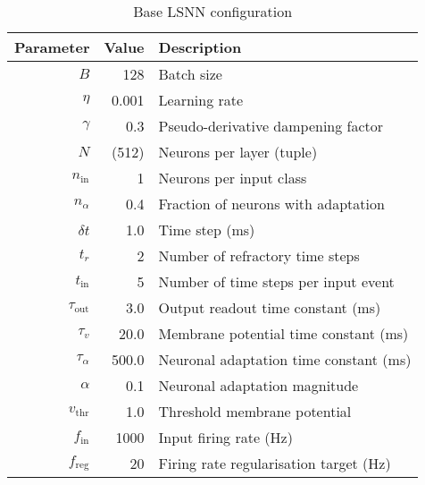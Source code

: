 \documentclass[../../report.tex]{subfiles}
\begin{document}
\begin{table}
  \begin{center}
    \renewcommand{\arraystretch}{1.25}
    \begin{tabular}{ r | r | l }
      Parameter & Value & Description
      \\ \hline
      \(B\) & 128 & Batch size
      \\
      \(\eta\) & 0.001 & Learning rate
      \\
      \(\gamma\) & 0.3 & Pseudo-derivative dampening factor
      \\
      \(N\) & (512) & Neurons per layer (tuple)
      \\
      \(n_\mathrm{in}\) & 1 & Neurons per input class
      \\
      \(n_\alpha\) & 0.4 & Fraction of neurons with adaptation
      \\
      \(\delta t\) & 1.0 & Time step (ms)
      \\
      \(t_r\) & 2 & Number of refractory time steps
      \\
      \(t_\mathrm{in}\) & 5 & Number of time steps per input event
      \\
      \(\tau_\mathrm{out}\) & 3.0 & Output readout time constant (ms)
      \\
      \(\tau_v\) & 20.0 & Membrane potential time constant (ms)
      \\
      \(\tau_\alpha\) & 500.0 & Neuronal adaptation time constant (ms)
      \\
      \(\alpha\) & 0.1 & Neuronal adaptation magnitude
      \\
      \(v_\mathrm{thr}\) & 1.0 & Threshold membrane potential
      \\
      \(f_\mathrm{in}\) & 1000 & Input firing rate (Hz)
      \\
      \(f_\mathrm{reg}\) & 20 & Firing rate regularisation target (Hz)
      \\
    \end{tabular}
  \end{center}
  \caption{Base LSNN configuration}
  \label{tab:lsnn-base}
\end{table}
\end{document}
